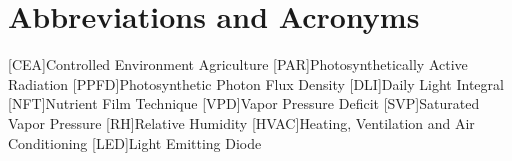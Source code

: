 \chapter{Abbreviations and Acronyms}
%
%
\begin{acronym}%
	[CEA]{Controlled Environment Agriculture}
	[PAR]{Photosynthetically Active Radiation}
	[PPFD]{Photosynthetic Photon Flux Density}
	[DLI]{Daily Light Integral}
	[NFT]{Nutrient Film Technique}
	[VPD]{Vapor Pressure Deficit}
	[SVP]{Saturated Vapor Pressure}
	[RH]{Relative Humidity}
	[HVAC]{Heating, Ventilation and Air Conditioning}
	[LED]{Light Emitting Diode}
\end{acronym}
